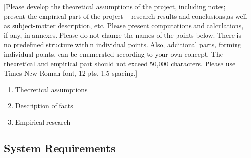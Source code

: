 [Please develop the theoretical assumptions of the project, including notes;
present the empirical part of the project -- research results and conclusions,as well as subject-matter description, etc.
Please present computations and calculations, if any, in annexes.
Please do not change the names of the points below.
There is no predefined structure within individual points.
Also, additional parts, forming individual points, can be enumerated according to your own concept.
The theoretical and empirical part should not exceed 50,000 characters.
Please use Times New Roman font, 12 pts, 1.5 spacing.]
\begin{enumerate}
    \item Theoretical assumptions
    \item Description of facts
    \item Empirical research
\end{enumerate}

\subsection{System Requirements}\label{subsec:system-requirements}
